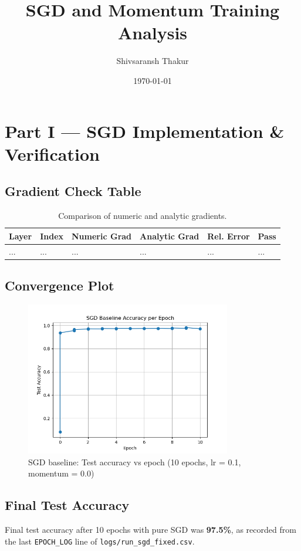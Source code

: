\documentclass[11pt]{article}
\title{SGD and Momentum Training Analysis}
\author{Shivsaransh Thakur}
\date{\today}
\begin{document}
\maketitle

\section{Part I — SGD Implementation \& Verification}

\subsection{Gradient Check Table}
\begin{table}[H]
\centering
\begin{tabular}{llllll}
\toprule
\textbf{Layer} & \textbf{Index} & \textbf{Numeric Grad} & \textbf{Analytic Grad} & \textbf{Rel. Error} & \textbf{Pass} \\
\midrule
... & ... & ... & ... & ... & ... \\
\bottomrule
\end{tabular}
\caption{Comparison of numeric and analytic gradients.}
\end{table}

\subsection{Convergence Plot}
\begin{figure}[H]
\centering
\includegraphics[width=0.8\textwidth]{../figures/sgd_baseline.png}
\caption{SGD baseline: Test accuracy vs epoch (10 epochs, lr = 0.1, momentum = 0.0)}
\end{figure}

\subsection{Final Test Accuracy}
Final test accuracy after 10 epochs with pure SGD was \textbf{97.5\%}, as recorded from the last \texttt{EPOCH\_LOG} line of \texttt{logs/run\_sgd\_fixed.csv}.
\end{document}
